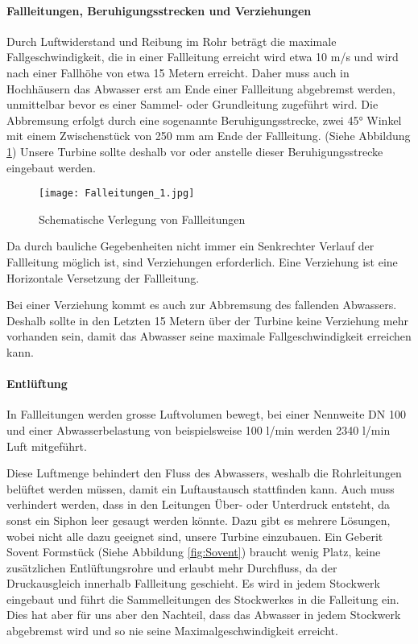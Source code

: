 \paragraph{Fallleitungen, Beruhigungsstrecken und Verziehungen}
Durch Luftwiderstand und Reibung im Rohr beträgt die maximale Fallgeschwindigkeit, die in einer Fallleitung erreicht wird etwa 10 m/s und wird nach einer Fallhöhe von etwa 15 Metern erreicht. Daher muss auch in Hochhäusern das Abwasser erst am Ende einer Fallleitung abgebremst werden, unmittelbar bevor es einer Sammel- oder Grundleitung zugeführt wird. Die Abbremsung erfolgt durch eine sogenannte Beruhigungsstrecke, zwei 45° Winkel mit einem Zwischenstück von 250 mm am Ende der Fallleitung. (Siehe Abbildung \ref{fig:Falleitungen}) Unsere Turbine sollte deshalb vor oder anstelle dieser Beruhigungsstrecke eingebaut werden.
\cite{baunetzwissen}

\begin{figure}[H]
	\centering
	\texttt{[image: Falleitungen\_1.jpg]}
	\caption{Schematische Verlegung von Fallleitungen \cite{baunetzwissen}}
	\label{fig:Falleitungen}
	
\end{figure}

Da durch bauliche Gegebenheiten nicht immer ein Senkrechter Verlauf der Fallleitung möglich ist, sind Verziehungen erforderlich. Eine Verziehung ist eine Horizontale Versetzung der Fallleitung. \cite{docplayer}

Bei einer Verziehung kommt es auch zur Abbremsung des fallenden Abwassers. Deshalb sollte in den Letzten 15 Metern über der Turbine keine Verziehung mehr vorhanden sein, damit das Abwasser seine maximale Fallgeschwindigkeit erreichen kann.

\paragraph{Entlüftung}
In Fallleitungen werden grosse Luftvolumen bewegt, bei einer Nennweite DN 100 und einer Abwasserbelastung von beispielsweise 100 l/min werden 2340 l/min Luft mitgeführt.
\cite{docplayer}

Diese Luftmenge behindert den Fluss des Abwassers, weshalb die Rohrleitungen belüftet werden müssen, damit ein Luftaustausch stattfinden kann. Auch muss verhindert werden, dass in den Leitungen Über- oder Unterdruck entsteht, da sonst ein Siphon leer gesaugt werden könnte. Dazu gibt es mehrere Lösungen, wobei nicht alle dazu geeignet sind, unsere Turbine einzubauen. Ein Geberit Sovent Formstück (Siehe Abbildung \ref{fig:Sovent}) braucht wenig Platz, keine zusätzlichen Entlüftungsrohre und erlaubt mehr Durchfluss, da der Druckausgleich innerhalb Fallleitung geschieht. Es wird in jedem Stockwerk eingebaut und führt die Sammelleitungen des Stockwerkes in die Falleitung ein. Dies hat aber für uns aber den Nachteil, dass das Abwasser in jedem Stockwerk abgebremst wird und so nie seine Maximalgeschwindigkeit erreicht.

